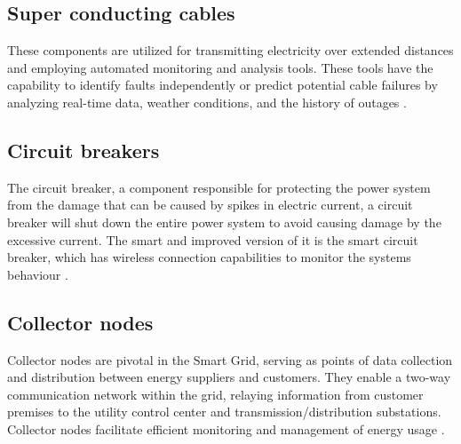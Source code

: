 






\subsection{Super conducting cables}
These components are utilized for transmitting electricity over extended distances and employing automated monitoring and analysis tools. These tools have the capability to identify faults independently or predict potential cable failures by analyzing real-time data, weather conditions, and the history of outages \cite{elprocus_smartgrid}.
\subsection{Circuit breakers}
The circuit breaker, a component responsible for protecting the power system from the damage that can be caused by spikes in electric current, a circuit breaker will shut down the entire power system to avoid causing damage by the excessive current. The smart and improved version of it is the smart circuit breaker, which has wireless connection capabilities to monitor the systems behaviour \cite{circuitbreaker}.
\subsection{Collector nodes}

Collector nodes are pivotal in the Smart Grid, serving as points of data collection and distribution between energy suppliers and customers. They enable a two-way communication network within the grid, relaying information from customer premises to the utility control center and transmission/distribution substations. Collector nodes facilitate efficient monitoring and management of energy usage \cite{cunjiang2012architecture}.

